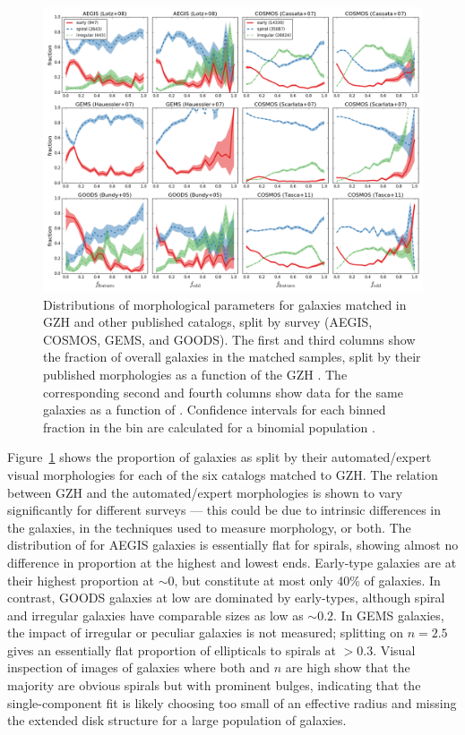 \documentclass[twocolumn]{aastex6}
\begin{document}
\begin{figure}
\center
\includegraphics[width=1.0\textwidth]{figures/comparisons.png}
\caption{Distributions of morphological parameters for galaxies matched in GZH and other published catalogs, split by survey (AEGIS, COSMOS, GEMS, and GOODS). The first and third columns show the fraction of overall galaxies in the matched samples, split by their published morphologies as a function of the GZH \fbest. The corresponding second and fourth columns show data for the same galaxies as a function of \fodd. Confidence intervals for each binned fraction in the bin are calculated for a binomial population \citep{cam11}.}
\label{fig:comparisons}
\end{figure}

Figure~\ref{fig:comparisons} shows the proportion of galaxies as split by their automated/expert visual morphologies for each of the six catalogs matched to GZH. The relation between GZH and the automated/expert morphologies is shown to vary significantly for different surveys --- this could be due to intrinsic differences in the galaxies, in the techniques used to measure morphology, or both. The distribution of \fbest{} for AEGIS galaxies is essentially flat for spirals, showing almost no difference in proportion at the highest and lowest ends. Early-type galaxies are at their highest proportion at \fbest$\sim0$, but constitute at most only 40\% of galaxies. In contrast, GOODS galaxies at low \fbest{} are dominated by early-types, although spiral and irregular galaxies have comparable sizes as low as \fbest$\sim0.2$. In GEMS galaxies, the impact of irregular or peculiar galaxies is not measured; splitting on $n=2.5$ gives an essentially flat proportion of ellipticals to spirals at \fbest$>0.3$. Visual inspection of images of galaxies where both \fbest{} and $n$ are high show that the majority are obvious spirals but with prominent bulges, indicating that the single-component \sersic{} fit is likely choosing too small of an effective radius and missing the extended disk structure for a large population of galaxies. 
\end{document}
